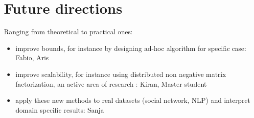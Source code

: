 \section{Future directions}
Ranging from theoretical to practical ones:

\begin{itemize}
	\item improve bounds, for instance by designing ad-hoc algorithm for
		specific case: Fabio, Aris
	\item improve scalability, for instance using distributed non negative
		matrix factorization, an active area of research
		\autocite{Bhojanapalli2014,Hastie2014,Udell2014}: Kiran, Master student
	\item apply these new methods to real datasets (social network, NLP) and
		interpret domain specific results: Sanja
\end{itemize}
